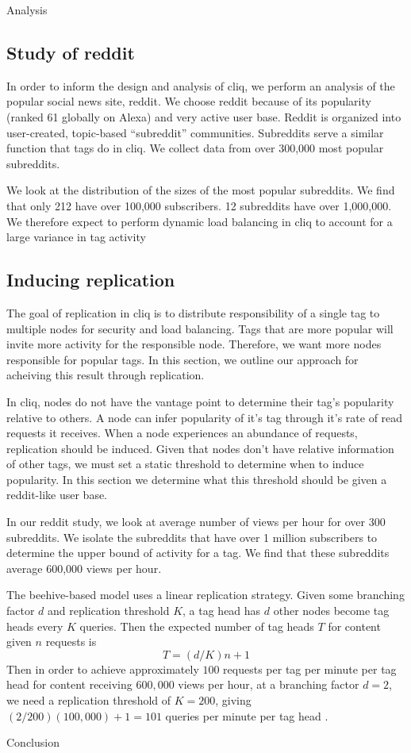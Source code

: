 \documentclass{sig-alternate}
\begin{document}
\begin{section}{Analysis}

\subsection{Study of reddit}
\label{subsec:redditstudy}

In order to inform the design and analysis of cliq, we perform an analysis of the popular social news site, reddit. We choose reddit because of its popularity (ranked 61 globally on Alexa) and very active user base. Reddit is organized into user-created, topic-based ``subreddit'' communities. Subreddits serve a similar function that tags do in cliq. We collect data from over 300,000 most popular subreddits.

We look at the distribution of the sizes of the most popular subreddits. We find that only 212 have over 100,000 subscribers. 12 subreddits have over 1,000,000. We therefore expect to perform dynamic load balancing in cliq 
to account for a large variance in tag activity

\subsection{Inducing replication}
\label{subsec:inducereplication} 
The goal of replication in cliq is to distribute responsibility of a single tag to multiple nodes for security and load balancing. Tags that are more popular will invite more activity for the responsible node. Therefore, we want more nodes responsible for popular tags. In this section, we outline our approach for acheiving this result through replication.

In cliq, nodes do not have the vantage point to determine their tag's popularity relative to others. A node can infer popularity of it's tag through it's rate of read requests it receives. When a node experiences an abundance of requests, replication should be induced. Given that nodes don't have relative information of other tags, we must set a static threshold to determine when to induce popularity. In this section we determine what this threshold should be given a reddit-like user base. 

In our reddit study, we look at average number of views per hour for over 300 subreddits. We isolate the subreddits that have over 1 million subscribers to determine the upper bound of activity for a tag. We find that these subreddits average 600,000 views per hour. 

The beehive-based model uses a linear replication strategy. Given some
branching factor $d$ and replication threshold $K$, a tag head has $d$
other nodes become tag heads every $K$ queries. Then the expected
number of tag heads $T$ for content given $n$ requests is
\[ 
T = (d/K)n + 1
\]
Then in order to achieve approximately $100$ requests per tag per
minute per tag head for content receiving $600,000$ views per hour, at
a branching factor $d = 2$, we need a replication threshold of $K =
200$, giving $(2/200)(100,000) + 1 = 101$ queries per minute per tag
head \cite{ramasubramanian2004beehive}.

\end{section}

\begin{section}{Conclusion}
  
\end{section}



\end{document}
